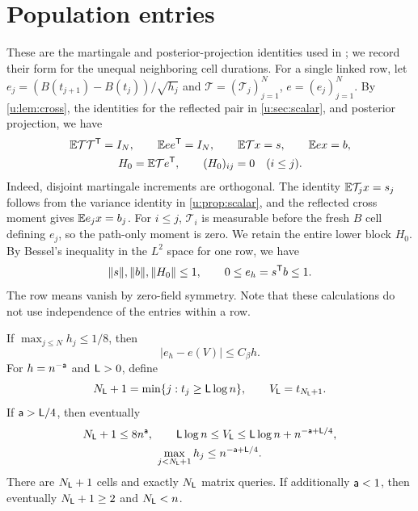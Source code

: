 \section{Population entries}\label{u:sec:proposal-entries}

These are the martingale and posterior-projection identities used in
\cite[Section~4, proof of Proposition~5]{oai-typical-upper}; we record
their form for the unequal neighboring cell durations.
For a single linked row, let
$e_j=(B(t_{j+1})-B(t_j))/\sqrt{h_j}$ and
$\mathcal T=(\mathcal T_j)_{j=1}^N$, $e=(e_j)_{j=1}^N$.
By \cref{u:lem:cross}, the identities for the reflected pair in
\cref{u:sec:scalar}, and posterior projection, we have
\begin{equation}\label{u:eq:population-entries}
 \begin{gathered}
 \mathbb E\mathcal T\mathcal T^{\mathsf T}=I_N,\qquad
 \mathbb E ee^{\mathsf T}=I_N,\qquad
 \mathbb E\mathcal T x=s,\qquad \mathbb E ex=b,\\
 H_0=\mathbb E\mathcal T e^{\mathsf T},\qquad
 (H_0)_{ij}=0\quad(i\le j).
 \end{gathered}
\end{equation}
Indeed, disjoint martingale increments are orthogonal.
The identity $\mathbb E\mathcal T_jx=s_j$ follows from the variance identity
in \cref{u:prop:scalar}, and the reflected cross moment gives
$\mathbb E e_jx=b_j$. For $i\le j$, $\mathcal T_i$ is measurable before
the fresh $B$ cell defining $e_j$, so the path-only moment is zero.
We retain the entire lower block $H_0$. By Bessel's inequality in the
$L^2$ space for one row, we have
\begin{equation}\label{u:eq:population-bounds}
 \lVert s\rVert,\lVert b\rVert,\lVert H_0\rVert\le1,\qquad
 0\le e_h=s^{\mathsf T}b\le1.
\end{equation}
The row means vanish by zero-field symmetry. Note that these calculations do not use
independence of the entries within a row.

\begin{lemma}\label{u:lem:quad}
If $\max_{j\le N}h_j\le1/8$, then
\begin{equation}\label{u:eq:adjacent-quadrature}
 |e_h-e(V)|\le C_\beta h.
\end{equation}
For $h=n^{-\mathsf{a}}$ and $\mathsf{L}>0$, define
\[
 N_{\mathsf{L}}+1=\min\{j:t_j\ge\mathsf{L}\log n\},\qquad
 V_{\mathsf{L}}=t_{N_{\mathsf{L}}+1}.
\]
If $\mathsf{a}>\mathsf{L}/4$, then eventually
\begin{equation}\label{u:eq:growing-stopping}
 \begin{gathered}
 N_{\mathsf{L}}+1\le8n^{\mathsf{a}},\qquad
 \mathsf{L}\log n\le V_{\mathsf{L}}
                \le\mathsf{L}\log n+n^{-\mathsf{a}+\mathsf{L}/4},\\
 \max_{j<N_{\mathsf{L}}+1}h_j\le n^{-\mathsf{a}+\mathsf{L}/4}.
 \end{gathered}
\end{equation}
There are $N_{\mathsf{L}}+1$ cells and exactly $N_{\mathsf{L}}$ matrix queries.
If additionally $\mathsf{a}<1$, then eventually $N_{\mathsf{L}}+1\ge2$ and
$N_{\mathsf{L}}<n$.
\end{lemma}

